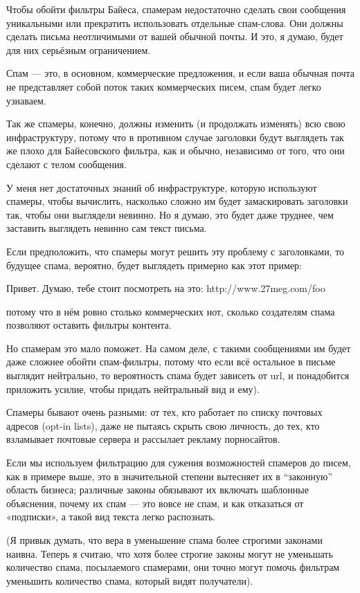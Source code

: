 \documentclass[ebook,12pt,oneside,openany]{memoir}
\begin{document}
Чтобы обойти фильтры Байеса, спамерам недостаточно сделать свои
сообщения уникальными или прекратить использовать отдельные
спам-слова. Они должны сделать письма неотличимыми от вашей обычной
почты. И это, я думаю, будет для них серьёзным ограничением.

Спам — это, в основном, коммерческие предложения, и если ваша обычная
почта не представляет собой поток таких коммерческих писем, спам будет
легко узнаваем.

Так же спамеры, конечно, должны изменить (и продолжать изменять) всю
свою инфраструктуру, потому что в противном случае заголовки будут
выглядеть так же плохо для Байесовского фильтра, как и обычно,
независимо от того, что они сделают с телом сообщения.

У меня нет достаточных знаний об инфраструктуре, которую используют
спамеры, чтобы вычислить, насколько сложно им будет замаскировать
заголовки так, чтобы они выглядели невинно. Но я думаю, это будет даже
труднее, чем заставить выглядеть невинно сам текст письма.

Если предположить, что спамеры могут решить эту проблему с
заголовками, то будущее спама, вероятно, будет выглядеть примерно как
этот пример:

Привет. Думаю, тебе стоит посмотреть на это: http://www.27meg.com/foo



потому что в нём ровно столько коммерческих нот, сколько создателям
спама позволяют оставить фильтры контента.

Но спамерам это мало поможет. На самом деле, с такими сообщениями им
будет даже сложнее обойти спам-фильтры, потому что если всё остальное
в письме выглядит нейтрально, то вероятность спама будет зависеть от
url, и понадобится приложить усилие, чтобы придать нейтральный вид и
ему).

Спамеры бывают очень разными: от тех, кто работает по списку почтовых
адресов (opt-in lists), даже не пытаясь скрыть свою личность, до тех,
кто взламывает почтовые сервера и рассылает рекламу порносайтов.

Если мы используем фильтрацию для сужения возможностей спамеров до
писем, как в примере выше, это в значительной степени вытесняет их в
“законную” область бизнеса; различные законы обязывают их включать
шаблонные объяснения, почему их спам — это вовсе не спам, и как
отказаться от «подписки», а такой вид текста легко распознать.

(Я привык думать, что вера в уменьшение спама более строгими законами
наивна. Теперь я считаю, что хотя более строгие законы могут не
уменьшать количество спама, посылаемого спамерами, они точно могут
помочь фильтрам уменьшить количество спама, который видят получатели).
\end{document}
